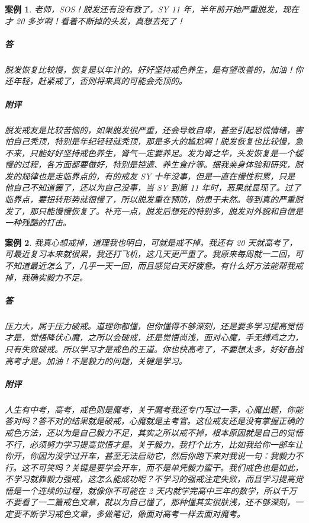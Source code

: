 \documentclass{ctexart}
\newtheorem{case}{案例}
\begin{document}
\begin{case}
    老师，SOS！脱发还有没有救了，SY 11 年，半年前开始严重脱发，现在才 20 多岁啊！看着不断掉的头发，真想去死了！
    \subparagraph{答} 脱发恢复比较慢，恢复是以年计的。好好坚持戒色养生，是有望改善的，加油！你还年轻，赶紧戒了，否则将来真的可能会秃顶的。
    \subparagraph{附评} 脱发戒友是比较苦恼的，如果脱发很严重，还会导致自卑，甚至引起恐慌情绪，害怕自己秃顶，特别是年纪轻轻就秃顶，那是多大的尴尬啊！脱发恢复也比较慢，急不来，只能好好坚持戒色养生，肾气一定要养足。发为肾之华，头发恢复是一个缓慢的过程，各方面都要做好，特别是控遗、养生食疗等。据我亲身体验和研究，脱发的规律也是走临界点的，有的戒友 SY 十年没事，但是一直在慢性积累，只是他自己不知道罢了，还以为自己没事，当 SY 到第 11 年时，恶果就显现了。过了临界点，要扭转形势就很慢了，所以脱发重在预防，防患于未然。等到真的严重脱发了，那只能慢慢恢复了。补充一点，脱发后想死的特别多，脱发对外貌和自信是一种残酷的打击。
\end{case}

\begin{case}
    我真心想戒掉，道理我也明白，可就是戒不掉。我还有 20 天就高考了，可最近复习本来就很累，我还打飞机，这几天更严重了。我原来每周就一二回，可不知道最近怎么了，几乎一天一回，而且感觉白天好疲惫。有什么好方法能帮我戒掉，我确实毅力不足。
    \subparagraph{答} 压力大，属于压力破戒。道理你都懂，但你懂得不够深刻，还是要多学习提高觉悟才是，觉悟降伏心魔，之所以会破戒，还是觉悟尚浅，面对心魔，手无缚鸡之力，只有失败破戒。所以学习才是戒色的王道。你也快高考了，不要想太多，好好备战高考才是。加油！不是毅力的问题，关键是学习。
    \subparagraph{附评} 人生有中考，高考，戒色则是魔考，关于魔考我还专门写过一季，心魔出题，你能答对吗？答不对的结果就是破戒，心魔就是主考官。这位戒友还是没有掌握正确的戒色方法，还以为是自己毅力不足，其实之所以戒不掉，根本原因就是自己的觉悟不行，必须努力学习提高觉悟才是。关于毅力，我打个比方，比如我给你一部车让你开，你因为没学过开车，甚至无法启动它，然后你跑下来对我说一句：我毅力不行。这不可笑吗？关键是要学会开车，而不是单凭毅力蛮干。我们戒色也是如此，不学习就靠毅力强戒，这怎么能成功呢？不学习的强戒注定失败，而且学习提高觉悟是一个连续的过程，就像你不可能在 2 天内就学完高中三年的数学，所以千万不要看了一二篇戒色文章，就以为自己懂了，那种懂其实很肤浅，还不够深刻，一定要不断学习戒色文章，多做笔记，像面对高考一样去面对魔考。
\end{case}
\end{document}
